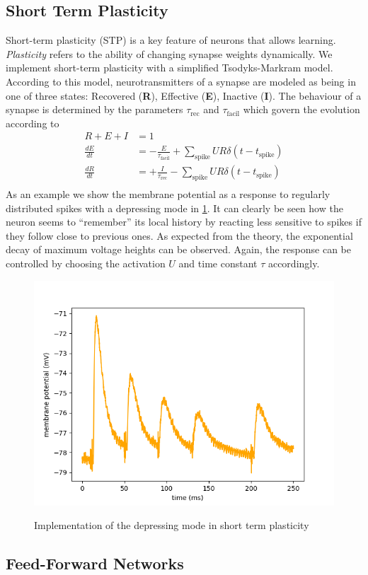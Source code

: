 \documentclass[a4paper,twocolumn]{article}
\begin{document}
\subsection{Short Term Plasticity}
Short-term plasticity (STP) is a key feature of neurons that allows learning.
\textit{Plasticity} refers to the ability of changing synapse weights dynamically.
We implement short-term plasticity with a simplified Tsodyks-Markram model.  According
to this model,  neurotransmitters of a synapse are modeled as being in one of
three states: Recovered (\textbf{R}),  Effective (\textbf{E}),  Inactive
(\textbf{I}).  The behaviour of a synapse is determined by the parameters
$\tau_\text{rec}$ and $\tau_\text{facil}$ which govern the evolution according to
\begin{align*}
	R + E + I &= 1 \\
	\frac{dE}{dt} &= - \frac{E}{\tau_\text{facil}} + \sum_\text{spike} UR\delta(t-t_\text{spike} ) \\
	\frac{dR}{dt} &= + \frac{I}{\tau_\text{rec}} - \sum_\text{spike} UR\delta(t-t_\text{spike} ) \\
\end{align*}
As an example we show the membrane potential as a response to regularly
distributed spikes with a depressing mode in \ref{stp_depress}.  It can clearly be
seen how the neuron seems to ``remember'' its local history by reacting less sensitive
to spikes if they follow close to previous ones.  As expected from the theory,
the exponential decay of maximum voltage heights can be observed.  Again,  the response
can be controlled by choosing the activation $U$ and time constant $\tau$ accordingly.
\begin{figure}
		\includegraphics[width=.5\textwidth]{figures/stp_depressing.png}
		\label{stp_depress}
		\caption{Implementation of the depressing mode in short term plasticity}
\end{figure}

\subsection{Feed-Forward Networks}
\label{sec:feed-forward}
\end{document}

